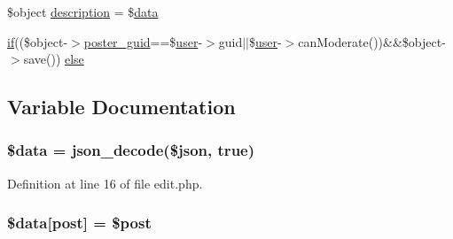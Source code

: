 \begin{DoxyCompactItemize}
\item 
\$object \hyperlink{components_2_ossn_wall_2actions_2wall_2post_2edit_8php_a7f60fcaa72b0968e6b6bd7d819fa6fd9}{description} = \$\hyperlink{components_2_ossn_comments_2actions_2comment_2edit_8php_a2b67189b42ab547221cb2a6408f4746a}{data}
\item 
\hyperlink{jquery_8tokeninput_8js_ad8dd46a3cbc004569e34401e9e71771a}{if}((\$object-\/$>$\hyperlink{user_8php_a24eb7b66e353d8983f6f2af979250671}{poster\+\_\+guid}==\$\hyperlink{ossn_8config_8db_8example_8php_a802544b7ba9f79bbf24ef67773d53bed}{user}-\/$>$guid$\vert$$\vert$\$\hyperlink{ossn_8config_8db_8example_8php_a802544b7ba9f79bbf24ef67773d53bed}{user}-\/$>$can\+Moderate())\&\&\$object-\/$>$save()) \hyperlink{components_2_ossn_wall_2actions_2wall_2post_2edit_8php_a947707fcbd4a8738af10ded11921378d}{else}
\end{DoxyCompactItemize}


\subsection{Variable Documentation}
\subsubsection[{\texorpdfstring{\$data}{$data}}]{\setlength{\rightskip}{0pt plus 5cm}\${\bf data} = json\+\_\+decode(\$json, true)}\hypertarget{components_2_ossn_wall_2actions_2wall_2post_2edit_8php_a6efc15b5a2314dd4b5aaa556a375c6d6}{}\label{components_2_ossn_wall_2actions_2wall_2post_2edit_8php_a6efc15b5a2314dd4b5aaa556a375c6d6}


Definition at line 16 of file edit.\+php.

\subsubsection[{\texorpdfstring{\$data}{$data}}]{\setlength{\rightskip}{0pt plus 5cm}\${\bf data}\mbox{[}\textquotesingle{}post\textquotesingle{}\mbox{]} = \$post}\hypertarget{components_2_ossn_wall_2actions_2wall_2post_2edit_8php_a2636a59d3992e952f52b5efbdd7fd57f}{}\label{components_2_ossn_wall_2actions_2wall_2post_2edit_8php_a2636a59d3992e952f52b5efbdd7fd57f}


